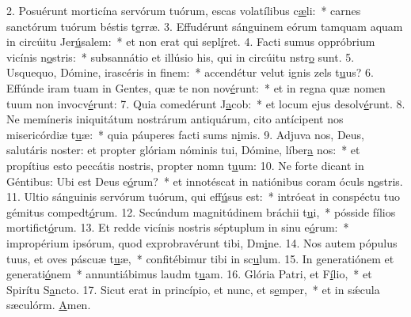 2. Posuérunt morticína servórum tuórum, escas volatílibus c\uline{æ}li:~* carnes sanctórum tuórum béstis t\uline{e}rræ.
3. Effudérunt sánguinem eórum tamquam aquam in circúitu Jer\uline{ú}salem:~* et non erat qui sepl\uline{í}ret.
4. Facti sumus oppróbrium vicínis n\uline{o}stris:~* subsannátio et illúsio his, qui in circúitu nstr\uline{o} sunt.
5. Usquequo, Dómine, irascéris in f\uline{i}nem:~* accendétur velut ignis zels t\uline{u}us?
6. Effúnde iram tuam in Gentes, quæ te non nov\uline{é}runt:~* et in regna quæ nomen tuum non invocv\uline{é}runt:
7. Quia comedérunt J\uline{a}cob:~* et locum ejus desolv\uline{é}runt.
8. Ne memíneris iniquitátum nostrárum antiquárum, cito antícipent nos misericórdiæ t\uline{u}æ:~* quia páuperes facti sums n\uline{i}mis.
9. Adjuva nos, Deus, salutáris noster: et propter glóriam nóminis tui, Dómine, líber\uline{a} nos:~* et propítius esto peccátis nostris, propter nomn t\uline{u}um:
10. Ne forte dicant in Géntibus: Ubi est Deus e\uline{ó}rum?~* et innotéscat in natiónibus coram óculs n\uline{o}stris.
11. Ultio sánguinis servórum tuórum, qui eff\uline{ú}sus est:~* intróeat in conspéctu tuo gémitus compedt\uline{ó}rum.
12. Secúndum magnitúdinem bráchii t\uline{u}i,~* pósside fílios mortifict\uline{ó}rum.
13. Et redde vicínis nostris séptuplum in sinu e\uline{ó}rum:~* impropérium ipsórum, quod exprobravérunt tibi, Dm\uline{i}ne.
14. Nos autem pópulus tuus, et oves páscuæ t\uline{u}æ,~* confitébimur tibi in sc\uline{u}lum.
15. In generatiónem et generati\uline{ó}nem~* annuntiábimus laudm t\uline{u}am.
16. Glória Patri, et F\uline{í}lio,~* et Spirítu S\uline{a}ncto.
17. Sicut erat in princípio, et nunc, et s\uline{e}mper,~* et in sǽcula sæculórm. \uline{A}men.
